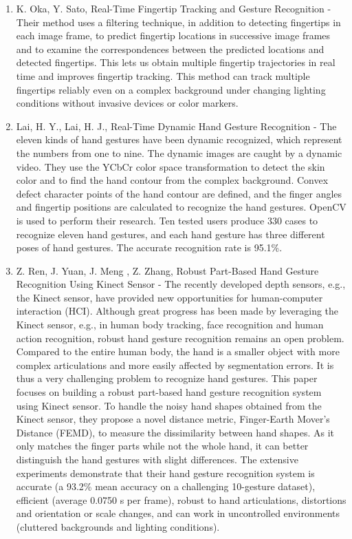 \documentclass[11pt]{report}
\begin{document}
\begin{enumerate}
    \item K. Oka, Y. Sato, Real-Time Fingertip Tracking and Gesture Recognition \cite{1} - Their method uses a filtering technique, in addition to detecting fingertips  in  each  image  frame,  to predict fingertip locations in successive image frames and to examine the correspondences between the predicted locations and detected fingertips. This lets us obtain multiple fingertip trajectories in real time and improves fingertip tracking. This method can track multiple fingertips reliably even on a complex background under changing lighting conditions without invasive devices or color markers.
    
    \item Lai, H. Y., Lai, H. J., Real-Time Dynamic Hand Gesture Recognition \cite{2} - The  eleven  kinds  of  hand  gestures have  been  dynamic  recognized,  which  represent  the  numbers from  one  to  nine.  The  dynamic  images  are  caught  by  a  dynamic video.  They  use  the  YCbCr  color  space  transformation  to  detect the  skin  color  and  to  find  the  hand  contour from  the  complex background. Convex defect character points of the hand contour are  defined,  and  the  finger  angles  and  fingertip  positions  are calculated to recognize the hand gestures. OpenCV is used to perform their research. Ten tested users produce 330 cases to recognize  eleven  hand  gestures,  and  each  hand  gesture  has  three different poses of hand gestures.  The accurate recognition rate is 95.1\%.

    \item Z. Ren, J. Yuan, J. Meng , Z. Zhang, Robust Part-Based Hand Gesture Recognition Using Kinect Sensor \cite{3} - The recently developed depth sensors, e.g., the Kinect sensor, have provided new opportunities for human-computer interaction (HCI). Although great progress has been made by leveraging the Kinect sensor, e.g., in human body tracking, face recognition and human action recognition, robust hand gesture recognition remains an open problem. Compared to the entire human body, the hand is a smaller object with more complex articulations and more easily affected by segmentation errors. It is thus a very challenging problem to recognize hand gestures. This paper focuses on building a robust part-based hand gesture recognition system using Kinect sensor. To handle the noisy hand shapes obtained from the Kinect sensor, they propose a novel distance metric, Finger-Earth Mover's Distance (FEMD), to measure the dissimilarity between hand shapes. As it only matches the finger parts while not the whole hand, it can better distinguish the hand gestures with slight differences. The extensive experiments demonstrate that their hand gesture recognition system is accurate (a 93.2\% mean accuracy on a challenging 10-gesture dataset), efficient (average 0.0750 s per frame), robust to hand articulations, distortions and orientation or scale changes, and can work in uncontrolled environments (cluttered backgrounds and lighting conditions).
    

\end{enumerate}
\end{document}
